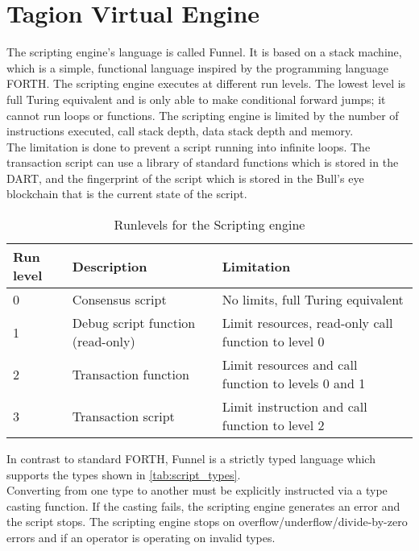 \section{Tagion Virtual Engine}\label{sec:TVM}

The scripting engine's language is called Funnel. It is based on a stack machine, which is a simple, functional language inspired by the programming language FORTH. 
The scripting engine executes at different run levels. The lowest level is full Turing equivalent and is only able to make conditional forward jumps; it cannot run loops or functions. The scripting engine is limited by the number of instructions executed, call stack depth, data stack depth and memory. \\

The limitation is done to prevent a script running into infinite loops. The transaction script can use a library of standard functions which is stored in the DART, and the fingerprint of the script which is stored in the Bull’s eye blockchain that is the current state of the script.

\begin{table}[H]
 \begin{center}
\begin{tabular}{|p{2cm}|p{3.5cm}|l|}
\hline
Run level & Description & Limitation\\
\hline
0 & Consensus script & No limits, full Turing equivalent \\
\hline
1 & Debug script function (read-only) & Limit resources, read-only call function to level 0 \\
\hline
2 & Transaction function & Limit resources and call function to levels 0 and 1 \\
\hline
3 & Transaction script & Limit instruction and call function to level 2 \\
\hline
\end{tabular}
\end{center}
\caption{Runlevels for the Scripting engine}
\label{tab:script_runlevl}
\end{table}

In contrast to standard FORTH, Funnel is a strictly typed language which supports the types shown in \cref{tab:script_types}.\\
Converting from one type to another must be explicitly instructed via a type casting function. If the casting fails, the scripting engine generates an error and the script stops. The scripting engine stops on overflow/underflow/divide-by-zero errors and if an operator is operating on invalid types.

